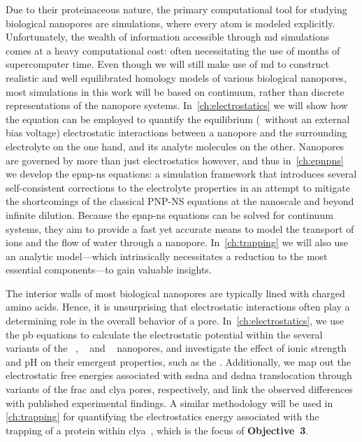 Due to their proteinaceous nature, the primary computational tool for studying biological nanopores are
 simulations, where every atom is modeled explicitly. Unfortunately, the wealth of information
accessible through \gls{md} simulations comes at a heavy computational cost: often necessitating the use of
months of supercomputer time. Even though we will still make use of \gls{md} to construct realistic and well
equilibrated homology models of various biological nanopores, most simulations in this work will be based on
continuum, rather than discrete representations of the nanopore systems. In~\cref{ch:electrostatics} we will
show how the  equation can be employed to quantify the equilibrium (\ie~without an external bias
voltage) electrostatic interactions between a nanopore and the surrounding electrolyte on the one hand, and
its analyte molecules on the other. Nanopores are governed by more than just electrostatics however, and thus
in~\cref{ch:epnpns} we develop the \gls{epnp-ns} equations: a simulation framework that introduces several
self-consistent corrections to the electrolyte properties in an attempt to mitigate the shortcomings of the
classical {PNP-NS} equations at the nanoscale and beyond infinite dilution. Because the \gls{epnp-ns}
equations can be solved for continuum systems, they aim to provide a fast yet accurate means to model the
transport of ions and the flow of water through a nanopore. In~\cref{ch:trapping} we will also use an analytic
model---which intrinsically necessitates a reduction to the most essential components---to gain valuable
insights.

%
%

The interior walls of most biological nanopores are typically lined with charged amino acids. Hence, it is
unsurprising that electrostatic interactions often play a determining role in the overall behavior of a pore.
In~\cref{ch:electrostatics}, we use the \gls{pb} equations to calculate the electrostatic potential within the
several variants of the ~\cite{Huang-2020}, ~\cite{Wloka-2016,Huang-2017} and
~\cite{Franceschini-2016} nanopores, and investigate the effect of ionic strength and pH on
their emergent properties, such as the . Additionally, we map out the electrostatic free
energies associated with \gls{ssdna} and \gls{dsdna} translocation through variants of the \gls{frac} and
\gls{clya} pores, respectively, and link the observed differences with published experimental findings. A
similar methodology will be used in \cref{ch:trapping} for quantifying the electrostatics energy associated
with the trapping of a protein within \gls{clya}~\cite{Soskine-Biesemans-2015}, which is the focus of
\textbf{Objective~3}.

